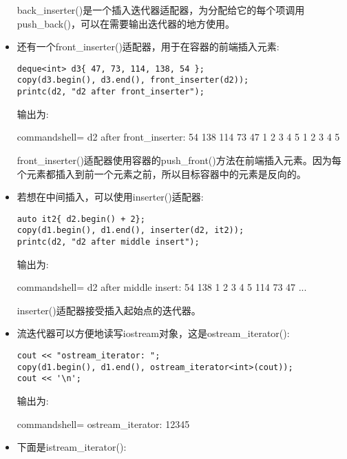 \begin{itemize}
back\_inserter()是一个插入迭代器适配器，为分配给它的每个项调用push\_back()，可以在需要输出迭代器的地方使用。

\item 
还有一个front\_inserter()适配器，用于在容器的前端插入元素:

\begin{lstlisting}[style=styleCXX]
deque<int> d3{ 47, 73, 114, 138, 54 };
copy(d3.begin(), d3.end(), front_inserter(d2));
printc(d2, "d2 after front_inserter");
\end{lstlisting}

输出为:

\begin{tcblisting}{commandshell={}}
d2 after front_inserter: 54 138 114 73 47 1 2 3 4 5 1 2 3 4 5
\end{tcblisting}

front\_inserter()适配器使用容器的push\_front()方法在前端插入元素。因为每个元素都插入到前一个元素之前，所以目标容器中的元素是反向的。

\item 
若想在中间插入，可以使用inserter()适配器:

\begin{lstlisting}[style=styleCXX]
auto it2{ d2.begin() + 2};
copy(d1.begin(), d1.end(), inserter(d2, it2));
printc(d2, "d2 after middle insert");
\end{lstlisting}

输出为:

\begin{tcblisting}{commandshell={}}
d2 after middle insert: 54 138 1 2 3 4 5 114 73 47 ...
\end{tcblisting}

inserter()适配器接受插入起始点的迭代器。

\item 
流迭代器可以方便地读写iostream对象，这是ostream\_iterator():

\begin{lstlisting}[style=styleCXX]
cout << "ostream_iterator: ";
copy(d1.begin(), d1.end(), ostream_iterator<int>(cout));
cout << '\n';
\end{lstlisting}

输出为:

\begin{tcblisting}{commandshell={}}
ostream_iterator: 12345
\end{tcblisting}

\item 
下面是istream\_iterator():


\end{itemize}
